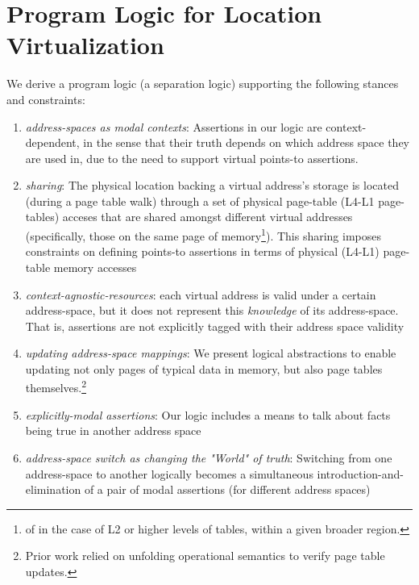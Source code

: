 \section{Program Logic for Location Virtualization}
\label{sec:logic}
\newcommand{\gammaPred}{\delta}
\newcommand{\gammaPreds}{\delta\textsf{s}}
\newcommand{\rtv}{\textsf{rtv}}
\newcommand{\qone}{\texttt{q1}}
\newcommand{\qtwo}{\texttt{q2}}
\newcommand{\qthree}{\texttt{q3}}
\newcommand{\qfour}{\texttt{q4}}

\newcommand{\sumwalkabs}[3]{
  \ownGhost\gammaPred{\authfrag{\singletonMap{#1}{(#2, #3)}}}
}

\newcommand{\sumapaces}[2]{
  \ownGhost\gammaPreds{\authfrag{\singletonMap{#1}{#2}}}
}
\newcommand{\ptableabswalk}[1]{\mathcal{A}\textsf{bsPTableWalk}(#1)}
\newcommand{\ptablestore}{\theta}

We derive a program logic (a separation logic) supporting the following stances and constraints:
\begin{enumerate}
\item \textit{address-spaces as modal contexts}: Assertions in our logic are context-dependent,
  in the sense that their truth depends on which address space they are used in, due to the need to support virtual points-to assertions.
\item \textit{sharing}: The physical location backing a virtual address's storage is located (during a page table walk) through a 
      set of physical page-table (L4-L1 page-tables) acceses that are shared amongst different virtual addresses (specifically,
      those on the same page of memory\footnote{of in the case of L2 or higher levels of tables, within a given broader region.}).
      This sharing imposes constraints on defining points-to assertions
      in terms of physical (L4-L1) page-table memory accesses
\item \textit{context-agnostic-resources}: each virtual address is valid under a certain address-space, 
      but it does not represent this \textit{knowledge} of its address-space. 
      That is, assertions are not explicitly tagged with their address space validity
\item \textit{updating address-space mappings}: We present logical abstractions to enable 
      updating not only pages of typical data in memory, but also page tables themselves.\footnote{Prior work relied on unfolding operational semantics
      to verify page table updates.}
\item \textit{explicitly-modal assertions}: Our logic includes a means to talk about facts being true
      in another address space
\item \textit{address-space switch as changing the "World" of truth}: Switching from one address-space to another logically
      becomes a simultaneous introduction-and-elimination of a pair of modal assertions (for different address spaces)
\end{enumerate}

